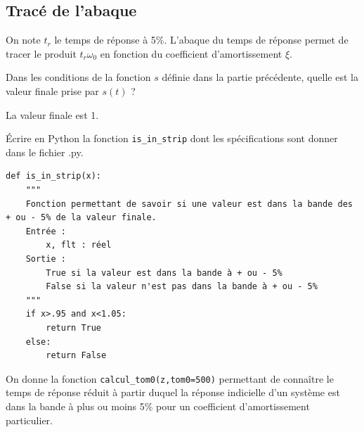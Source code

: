 \subsection*{Tracé de l'abaque}

On note $t_r$  le temps de réponse à 5\%. L'abaque du temps de réponse permet de tracer le produit $t_r\omega_0$ en fonction du coefficient d'amortissement $\xi$.

\begin{question}
Dans les conditions de la fonction $s$ définie dans la partie précédente, quelle est la valeur finale prise par $s(t)$ ?
\end{question}
\ifprof
\begin{corrige}
La valeur finale est 1. 
\end{corrige}
\else

\fi


\begin{question}
Écrire en Python la fonction \lstinline{is_in_strip} dont les spécifications sont donner dans le fichier .py. 
\end{question}
\ifprof
\else
\fi

\ifprof
\begin{corrige}
\begin{lstlisting}
def is_in_strip(x):
    """
    Fonction permettant de savoir si une valeur est dans la bande des + ou - 5% de la valeur finale.
    Entrée : 
        x, flt : réel
    Sortie : 
        True si la valeur est dans la bande à + ou - 5%
        False si la valeur n'est pas dans la bande à + ou - 5%
    """
    if x>.95 and x<1.05:
        return True
    else:
        return False
\end{lstlisting}
\end{corrige}
\else



\fi

\ifprof
\else

On donne la fonction \lstinline{calcul_tom0(z,tom0=500)}  permettant de connaître le temps de réponse réduit à partir duquel la réponse indicielle d'un système est dans la bande à plus ou moins 5\% pour un coefficient d'amortissement particulier.

